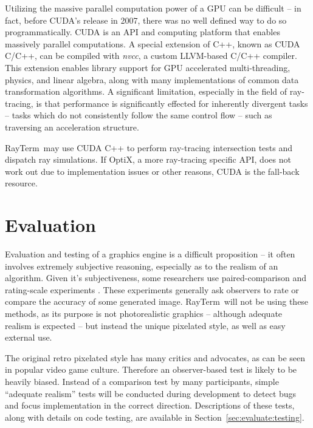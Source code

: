 \documentclass[11pt]{article}
\newcommand{\name}{{\sc RayTerm}}
\begin{document}
Utilizing the massive parallel computation power of a GPU can be difficult -- in fact, before CUDA's release in 2007, there was no well defined way to do so programmatically.
CUDA is an API and computing platform that enables massively parallel computations.
A special extension of C++, known as CUDA C/C++, can be compiled with {\it nvcc}, a custom LLVM-based C/C++ compiler.
This extension enables library support for GPU accelerated multi-threading, physics, and linear algebra, along with many implementations of common data transformation algorithms.
A significant limitation, especially in the field of ray-tracing, is that performance is significantly effected for inherently divergent tasks -- tasks which do not consistently follow the same control flow -- such as traversing an acceleration structure.

\name\ may use CUDA C++ to perform ray-tracing intersection tests and dispatch ray simulations.
If OptiX, a more ray-tracing specific API, does not work out due to implementation issues or other reasons, CUDA is the fall-back resource.

\section{Evaluation}
\label{sec:evaluate}


Evaluation and testing of a graphics engine is a difficult proposition -- it often involves extremely subjective reasoning, especially as to the realism of an algorithm.
Given it's subjectiveness, some researchers use paired-comparison and rating-scale experiments \cite{kuang2007evaluating}.
These experiments generally ask observers to rate or compare the accuracy of some generated image.
\name\ will not be using these methods, as its purpose is not photorealistic graphics -- although adequate realism is expected -- but instead the unique pixelated style, as well as easy external use.

The original retro pixelated style has many critics and advocates, as can be seen in popular video game culture.
Therefore an observer-based test is likely to be heavily biased.
Instead of a comparison test by many participants, simple ``adequate realism'' tests will be conducted during development to detect bugs and focus implementation in the correct direction.
Descriptions of these tests, along with details on code testing, are available in Section~\ref{sec:evaluate:testing}.
\end{document}
